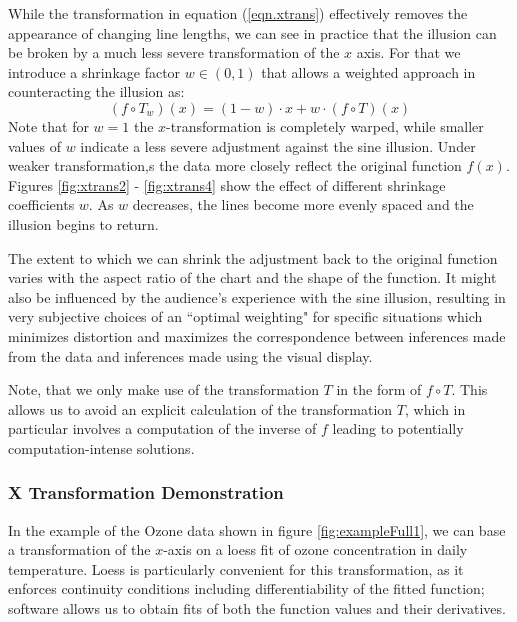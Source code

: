 \documentclass[11pt]{isuthesis}\usepackage[]{graphicx}\usepackage[]{color}
\begin{document}
While the transformation in equation (\ref{eqn.xtrans}) effectively removes the appearance of changing line lengths, we can see in practice that the illusion can be broken by a much less severe transformation of the $x$ axis. 
For that we introduce a shrinkage factor $w \in (0,1)$ that allows a weighted approach in counteracting the illusion as: 
%
\begin{equation}\label{eqn.xtrans.weighted}
(f \circ T_w)(x) = (1-w) \cdot x + w \cdot (f \circ T)(x)
\end{equation}
%
Note that for $w=1$ the $x$-transformation is completely warped, while smaller values of $w$ indicate a less severe adjustment against the sine illusion.  Under  weaker transformation,s the data more closely reflect the original function $f(x)$. 
Figures \ref{fig:xtrans2} - \ref{fig:xtrans4} show the effect of different shrinkage coefficients $w$. As $w$ decreases, the lines become more evenly spaced and the illusion begins to return. 

The extent  to which we can shrink the adjustment back to the original function  varies with the aspect ratio of the chart and the shape of the function. It might also be influenced by the audience's experience with the sine illusion, resulting in very subjective choices of an ``optimal weighting" for specific situations which minimizes distortion and maximizes the correspondence between inferences made from the data and inferences made using the visual display.


Note, that we only make use of the transformation $T$ in the form of $f \circ T$. This allows us to avoid an explicit calculation of the transformation $T$, which in particular  involves a computation of the inverse of $f$ leading to potentially computation-intense solutions. 
\subsubsection{X Transformation Demonstration}


In the example of the Ozone data shown in figure \ref{fig:exampleFull1}, we can base a transformation of the $x$-axis on a loess fit of ozone concentration in daily temperature. Loess is particularly convenient for this transformation, as it enforces continuity conditions including differentiability of the fitted function; software allows us to obtain fits of both the function values and their derivatives.
\end{document}
